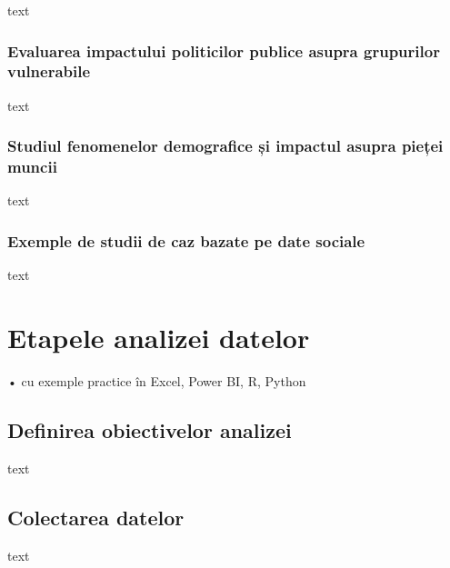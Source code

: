 \documentclass[
  11pt,
  b5paper,
  nottoc]{book}
\begin{document}
text

\hypertarget{evaluarea-impactului-politicilor-publice-asupra-grupurilor-vulnerabile}{%
\subsection{Evaluarea impactului politicilor publice asupra grupurilor
vulnerabile}\label{evaluarea-impactului-politicilor-publice-asupra-grupurilor-vulnerabile}}

text

\hypertarget{studiul-fenomenelor-demografice-ux219i-impactul-asupra-pieux21bei-muncii}{%
\subsection{Studiul fenomenelor demografice și impactul asupra pieței
muncii}\label{studiul-fenomenelor-demografice-ux219i-impactul-asupra-pieux21bei-muncii}}

text

\hypertarget{exemple-de-studii-de-caz-bazate-pe-date-sociale}{%
\subsection{Exemple de studii de caz bazate pe date
sociale}\label{exemple-de-studii-de-caz-bazate-pe-date-sociale}}

text


\hypertarget{cap7}{%
\chapter{Etapele analizei datelor}\label{cap7}}

• cu exemple practice în Excel, Power BI, R, Python

\hypertarget{definirea-obiectivelor-analizei}{%
\section{Definirea obiectivelor
analizei}\label{definirea-obiectivelor-analizei}}

text

\hypertarget{colectarea-datelor}{%
\section{Colectarea datelor}\label{colectarea-datelor}}

text
\end{document}
